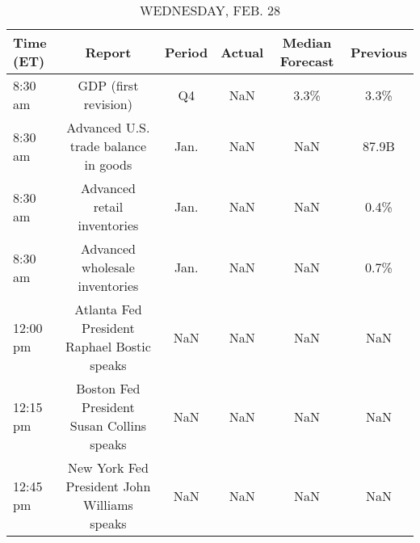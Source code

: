 \documentclass{article}%
\begin{document}
\begin{table}[htbp]%
\caption{WEDNESDAY, FEB. 28}%
\centering%
\begin{adjustbox}{width=1\textwidth}%
\begin{tabular}{lccccc}
\toprule
Time (ET) &                                      Report & Period & Actual & Median Forecast & Previous \\
\midrule
  8:30 am &                        GDP (first revision) &     Q4 &    NaN &            3.3\% &     3.3\% \\
  8:30 am &        Advanced U.S. trade balance in goods &   Jan. &    NaN &             NaN &    87.9B \\
  8:30 am &                 Advanced retail inventories &   Jan. &    NaN &             NaN &     0.4\% \\
  8:30 am &              Advanced wholesale inventories &   Jan. &    NaN &             NaN &     0.7\% \\
 12:00 pm & Atlanta Fed President Raphael Bostic speaks &    NaN &    NaN &             NaN &      NaN \\
 12:15 pm &   Boston Fed President Susan Collins speaks &    NaN &    NaN &             NaN &      NaN \\
 12:45 pm & New York Fed President John Williams speaks &    NaN &    NaN &             NaN &      NaN \\
\bottomrule
\end{tabular}
%
\end{adjustbox}%
\end{table}

%
\end{document}
